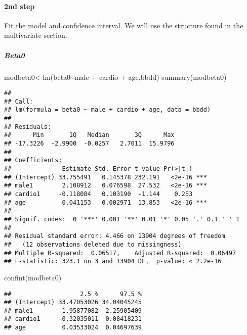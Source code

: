 \documentclass[
]{article}
\newenvironment{Shaded}{\begin{snugshade}}{\end{snugshade}}
\newcommand{\FunctionTok}[1]{\textcolor[rgb]{0.00,0.00,0.00}{#1}}
\newcommand{\NormalTok}[1]{#1}
\newcommand{\OtherTok}[1]{\textcolor[rgb]{0.56,0.35,0.01}{#1}}
\newcommand{\SpecialCharTok}[1]{\textcolor[rgb]{0.00,0.00,0.00}{#1}}
\begin{document}
\hypertarget{nd-step}{%
\paragraph{2nd step}\label{nd-step}}

Fit the model and confidence interval. We will use the structure found
in the multivariate section.

\hypertarget{beta0}{%
\subparagraph{Beta0}\label{beta0}}

\begin{Shaded}
\begin{Highlighting}[]
\NormalTok{modbeta0}\OtherTok{\textless{}{-}}\FunctionTok{lm}\NormalTok{(beta0}\SpecialCharTok{\textasciitilde{}}\NormalTok{male }\SpecialCharTok{+}\NormalTok{ cardio }\SpecialCharTok{+}\NormalTok{ age,bbdd)}
\FunctionTok{summary}\NormalTok{(modbeta0)}
\end{Highlighting}
\end{Shaded}

\begin{verbatim}
## 
## Call:
## lm(formula = beta0 ~ male + cardio + age, data = bbdd)
## 
## Residuals:
##      Min       1Q   Median       3Q      Max 
## -17.3226  -2.9900  -0.0257   2.7011  15.9796 
## 
## Coefficients:
##              Estimate Std. Error t value Pr(>|t|)    
## (Intercept) 33.755491   0.145378 232.191   <2e-16 ***
## male1        2.108912   0.076598  27.532   <2e-16 ***
## cardio1     -0.118084   0.103190  -1.144    0.253    
## age          0.041153   0.002971  13.853   <2e-16 ***
## ---
## Signif. codes:  0 '***' 0.001 '**' 0.01 '*' 0.05 '.' 0.1 ' ' 1
## 
## Residual standard error: 4.466 on 13904 degrees of freedom
##   (12 observations deleted due to missingness)
## Multiple R-squared:  0.06517,    Adjusted R-squared:  0.06497 
## F-statistic: 323.1 on 3 and 13904 DF,  p-value: < 2.2e-16
\end{verbatim}

\begin{Shaded}
\begin{Highlighting}[]
\FunctionTok{confint}\NormalTok{(modbeta0)}
\end{Highlighting}
\end{Shaded}

\begin{verbatim}
##                   2.5 %      97.5 %
## (Intercept) 33.47053026 34.04045245
## male1        1.95877082  2.25905409
## cardio1     -0.32035011  0.08418231
## age          0.03533024  0.04697639
\end{verbatim}
\end{document}
